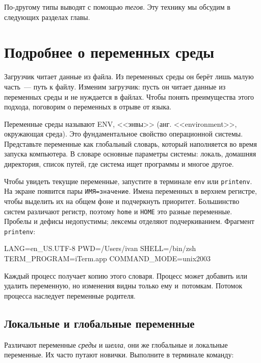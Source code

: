По-другому типы выводят с помощью \emph{тегов}. Эту технику мы обсудим в
следующих разделах главы.

\section{Подробнее о переменных среды}


Загрузчик читает данные из файла. Из переменных среды он берёт лишь малую
часть~--- путь к файлу. Изменим загрузчик: пусть он читает данные из переменных
среды и не нуждается в файлах. Чтобы понять преимущества этого подхода,
поговорим о переменных в отрыве от языка.

Переменные среды называют ENV, <<энвы>> (анг. <<environment>>, окружающая
среда). Это фундаментальное свойство операционной системы. Представьте
переменные как глобальный словарь, который наполняется во время запуска
компьютера. В словаре основные параметры системы: локаль, домашняя директория,
список путей, где система ищет программы и многое другое.


Чтобы увидеть текущие переменные, запустите в терминале \verb|env| или
\verb|printenv|. На экране появится пары \verb|ИМЯ=значение|. Имена переменных в
верхнем регистре, чтобы выделить их на общем фоне и подчеркнуть
приоритет. Большинство систем различают регистр, поэтому \verb|home| и
\verb|HOME| это разные переменные. Пробелы и дефисы недопустимы; лексемы
отделяют подчеркиванием. Фрагмент \verb|printenv|:

\begin{english}
  \begin{bash}
LANG=en_US.UTF-8
PWD=/Users/ivan
SHELL=/bin/zsh
TERM_PROGRAM=iTerm.app
COMMAND_MODE=unix2003
  \end{bash}
\end{english}

Каждый процесс получает копию этого словаря. Процесс может добавить или удалить
переменную, но изменения видны только ему и~потомкам. Потомок процесса наследует
переменные родителя.

\subsection{Локальные и глобальные переменные}


Различают переменные \emph{среды} и \emph{шелла}, они же глобальные и локальные
переменные. Их часто путают новички. Выполните в терминале команду:

